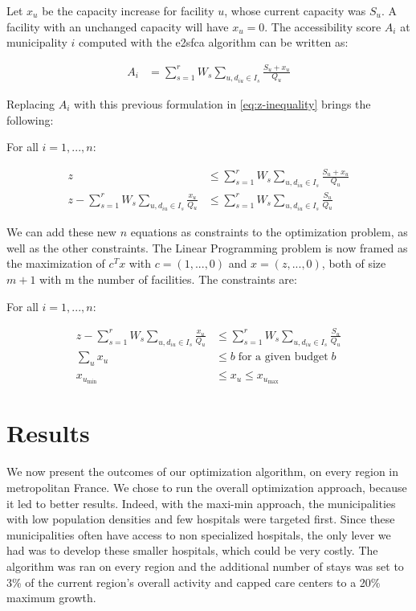 Let $x_u$ be the capacity increase for facility $u$,
whose current capacity was $S_u$. A facility with an unchanged capacity will
have $x_u=0$. The accessibility score $A_i$ at municipality $i$ computed with the
\ac{e2sfca} algorithm can be written as:

\begin{align*}
    A_i & = \sum_{s=1}^{r} W_s \sum_{u,d_{iu} \in I_s} \frac{S_u + x_u}{Q_u}
    \label{eq:A_i}
\end{align*}

Replacing $A_i$ with this previous formulation in \cref{eq:z-inequality} brings
the following:

For all $i=1, ... ,n$:

\begin{align*}
    z                                                              & \leq \sum_{s=1}^{r} W_s \sum_{u, d_{iu} \in I_s} \frac{S_u + x_u}{Q_u} \\
    z - \sum_{s=1}^{r} W_s \sum_{u,d_{iu} \in I_s} \frac{x_u}{Q_u} & \leq \sum_{s=1}^{r} W_s \sum_{u,d_{iu} \in I_s} \frac{S_u}{Q_u}
\end{align*}

We can add these new $n$ equations as constraints to the optimization problem,
as well as the other constraints. The Linear Programming problem is now framed
as the maximization of $c^T x$ with $c=(1, ... ,0)$ and $x=(z, ... ,0)$, both of
size $m+1$ with m the number of facilities. The constraints are:

For all $i=1, ... ,n$:

\begin{align*}
    z - \sum_{s=1}^{r} W_s \sum_{u,d_{iu} \in I_s} \frac{x_u}{Q_u} & \leq \sum_{s=1}^{r} W_s \sum_{u,d_{iu} \in I_s} \frac{S_u}{Q_u} \\
    \sum_{u} x_u                                                   & \leq b \; \text{for a given budget} \; b                        \\
    x_{u_\text{min}}                                               & \leq x_u \leq x_{u_\text{max}}
\end{align*}

\section{Results}

We now present the outcomes of our optimization algorithm, on every region in
metropolitan France. We chose to run the overall optimization approach, because
it led to better results. Indeed, with the maxi-min approach, the municipalities
with low population densities and few hospitals were targeted first. Since these
municipalities often have access to non specialized hospitals, the only lever we
had was to develop these smaller hospitals, which could be very costly. The
algorithm was ran on every region and the additional number of stays was set to
3\% of the current region's overall activity and capped care centers to a
20\% maximum growth.

